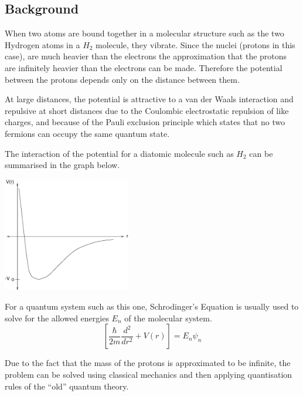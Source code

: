 \documentclass[a4paper]{IEEEtran}
\begin{document}
\subsection{Background}

      When two atoms are bound together in a molecular structure such as
      the two Hydrogen atoms in a $H_2$ molecule, they vibrate. Since
      the nuclei (protons in this case), are much heavier than the
      electrons the approximation that the protons are infinitely
      heavier than the electrons can be made. Therefore the potential
      between the protons depends only on the distance between them.

      At large distances, the potential is attractive to a van der Waals
      interaction and repulsive at short distances due to the Coulombic
      electrostatic repulsion of like charges, and because of the Pauli
      exclusion principle which states that no two fermions can occupy
      the same quantum state.

      The interaction of the potential for a diatomic molecule such as
      $H_2$ can be summarised in the graph below.

      \begin{center}
            \includegraphics[height=5cm]{potential.eps}
      \end{center}

      For a quantum system such as this one, Schrodinger's Equation is
      usually used to solve for the allowed energies $E_n$ of the molecular
      system.
      \begin{equation}
       \left[ \frac{\hbar}{2m}\frac{d^2}{dr^2} + V(r) \right] = E_n\psi_n
      \end{equation}

      Due to the fact that the mass of the protons is approximated to be
      infinite, the problem can be solved using classical mechanics and
      then applying quantisation rules of the ``old'' quantum theory.
\end{document}
